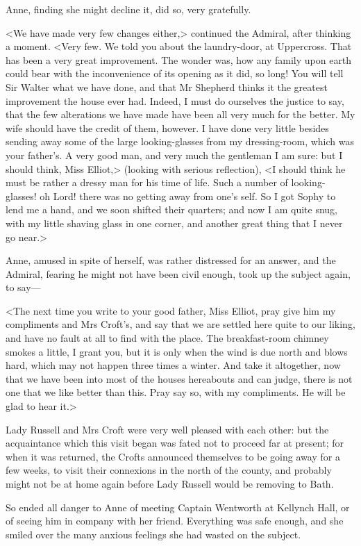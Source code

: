 Anne, finding she might decline it, did so, very gratefully.

<We have made very few changes either,> continued the Admiral, after thinking a moment. <Very few. We told you about the laundry-door, at Uppercross. That has been a very great improvement. The wonder was, how any family upon earth could bear with the inconvenience of its opening as it did, so long! You will tell Sir Walter what we have done, and that Mr Shepherd thinks it the greatest improvement the house ever had. Indeed, I must do ourselves the justice to say, that the few alterations we have made have been all very much for the better. My wife should have the credit of them, however. I have done very little besides sending away some of the large looking-glasses from my dressing-room, which was your father's. A very good man, and very much the gentleman I am sure: but I should think, Miss Elliot,> (looking with serious reflection), <I should think he must be rather a dressy man for his time of life. Such a number of looking-glasses! oh Lord! there was no getting away from one's self. So I got Sophy to lend me a hand, and we soon shifted their quarters; and now I am quite snug, with my little shaving glass in one corner, and another great thing that I never go near.>

Anne, amused in spite of herself, was rather distressed for an answer, and the Admiral, fearing he might not have been civil enough, took up the subject again, to say—

<The next time you write to your good father, Miss Elliot, pray give him my compliments and Mrs Croft's, and say that we are settled here quite to our liking, and have no fault at all to find with the place. The breakfast-room chimney smokes a little, I grant you, but it is only when the wind is due north and blows hard, which may not happen three times a winter. And take it altogether, now that we have been into most of the houses hereabouts and can judge, there is not one that we like better than this. Pray say so, with my compliments. He will be glad to hear it.>

Lady Russell and Mrs Croft were very well pleased with each other: but the acquaintance which this visit began was fated not to proceed far at present; for when it was returned, the Crofts announced themselves to be going away for a few weeks, to visit their connexions in the north of the county, and probably might not be at home again before Lady Russell would be removing to Bath.

So ended all danger to Anne of meeting Captain Wentworth at Kellynch Hall, or of seeing him in company with her friend. Everything was safe enough, and she smiled over the many anxious feelings she had wasted on the subject.